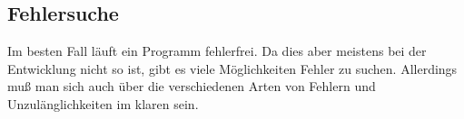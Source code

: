 \subsection[Fehlersuche]{Fehlersuche}
Im besten Fall läuft ein Programm fehlerfrei. Da dies aber meistens bei der Entwicklung nicht so ist, gibt es viele Möglichkeiten Fehler zu suchen. Allerdings muß man sich auch über die verschiedenen Arten von Fehlern und Unzulänglichkeiten im klaren sein.
